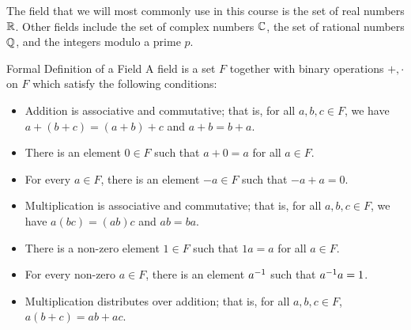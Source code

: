 The field that we will
most commonly use in this course is the set of real numbers $\mathbb R$.  Other fields include
the set of complex numbers $\mathbb C$, the set of rational numbers $\mathbb Q$, and the integers modulo
a prime $p$.  

\begin{edXshowhide}{Formal Definition of a Field}
A field is a set $F$ together with binary operations $+, \cdot$ on $F$ which satisfy the
following conditions:

\begin{itemize}
\item Addition is associative and commutative; that is, for all $a,b,c \in F$, we have
$a+(b+c) = (a+b)+c$ and $a+b  = b+a$.  
\item There is an element $0 \in F$ such that $a+0 = a$ for all $a \in F$.
\item For every $a\in F$, there is an element $-a \in F$ such that $-a + a = 0$.  
\item Multiplication is associative and commutative; that is, for all $a,b,c \in F$, we have
$a(bc) = (ab)c$ and $ab  = ba$.  
\item There is a non-zero element $1 \in F$ such that $1a = a$ for all $a \in F$.  
\item For every non-zero $a\in F$, there is an element $a^{-1}$ such that $a^{-1} a = 1$.  
\item Multiplication distributes over addition; that is, for all $a,b,c \in F$, $a(b+c) = ab + ac$.  
\end{itemize}

\end{edXshowhide}




\endedxtext

\endedxvertical
